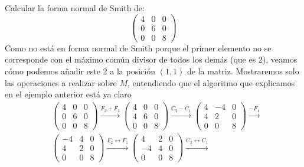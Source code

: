 \begin{ejemplo}
    Calcular la forma normal de Smith de:
    \begin{equation*}
        \left(\begin{array}{ccc}
            4 & 0 & 0 \\
            0 & 6 & 0 \\
            0 & 0 & 8
        \end{array}\right)
    \end{equation*}
    Como no está en forma normal de Smith porque el primer elemento no se corresponde con el máximo común divisor de todos los demás (que es 2), veamos cómo podemos añadir este 2 a la posición $(1,1)$ de la matriz. Mostraremos solo las operaciones a realizar sobre $M$, entendiendo que el algoritmo que explicamos en el ejemplo anterior está ya claro 
    \begin{align*}
        &\left(\begin{array}{ccc}
            4 & 0 & 0 \\
            0 & 6 & 0 \\
            0 & 0 & 8
        \end{array}\right)
        \xrightarrow{F_2 + F_1}
        \left(\begin{array}{ccc}
            4 & 0 & 0 \\
            4 & 6 & 0 \\
            0 & 0 & 8
        \end{array}\right)
        \xrightarrow{C_2 - C_1}
        \left(\begin{array}{ccc}
            4 & -4 & 0 \\
            4 & 2 & 0 \\
            0 & 0 & 8
        \end{array}\right)
        \xrightarrow{-F_1} \\
        &\left(\begin{array}{ccc}
            -4 & 4 & 0 \\
            4 & 2 & 0 \\
            0 & 0 & 8
        \end{array}\right)
        \xrightarrow{F_2\leftrightarrow F_1}
        \left(\begin{array}{ccc}
            4 & 2 & 0 \\
            -4 & 4 & 0 \\
            0 & 0 & 8
        \end{array}\right)
        \xrightarrow{C_2\leftrightarrow C_1}

\end{align*}
\end{ejemplo}
